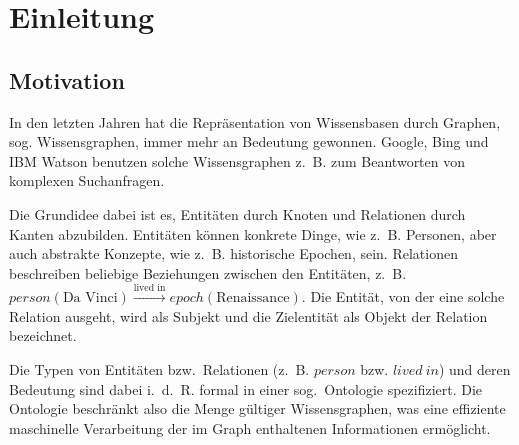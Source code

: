 \chapter{Einleitung}%
\label{sec:intro}


\section{Motivation}%
\label{sec:intro:motivation}

In den letzten Jahren hat die Repräsentation von Wissensbasen durch Graphen, sog. Wissensgraphen, immer mehr an Bedeutung gewonnen.
Google, Bing und IBM Watson benutzen solche Wissensgraphen z.~B. zum Beantworten von komplexen Suchanfragen.

Die Grundidee dabei ist es, Entitäten durch Knoten und Relationen durch Kanten abzubilden.
Entitäten können konkrete Dinge, wie z.~B. Personen, aber auch abstrakte Konzepte, wie z.~B. historische Epochen, sein.
Relationen beschreiben beliebige Beziehungen zwischen den Entitäten, z.~B. $person(\text{Da~Vinci}) \xrightarrow{\text{lived~in}} epoch(\text{Renaissance})$.
Die Entität, von der eine solche Relation ausgeht, wird als Subjekt und die Zielentität als Objekt der Relation bezeichnet.

Die Typen von Entitäten bzw.\ Relationen (z.~B. $person$ bzw. $lived~in$) und deren Bedeutung sind dabei i.~d.~R. formal in einer sog.\ Ontologie spezifiziert.
Die Ontologie beschränkt also die Menge gültiger Wissensgraphen, was eine effiziente maschinelle Verarbeitung der im Graph enthaltenen Informationen ermöglicht.

